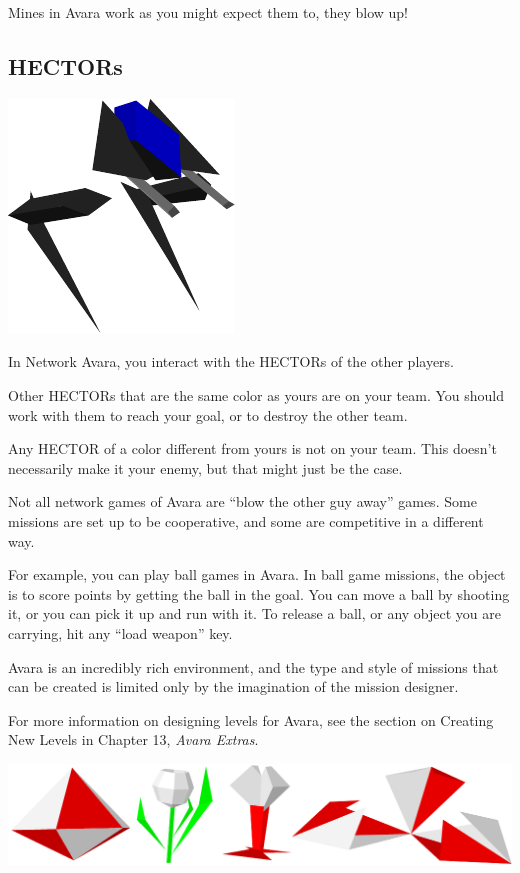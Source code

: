 \documentclass{article}
\begin{document}
Mines in Avara work as you might expect them to, they blow up!

\subsection{HECTORs}
\begin{center}
	\includegraphics{img/10.pdf}
\end{center}

In Network Avara, you interact with the HECTORs of the other players.

Other HECTORs that are the same color as yours are on your team. You should work with them to reach your goal, or to destroy the other team.

Any HECTOR of a color different from yours is not on your team. This doesn't necessarily make it your enemy, but that might just be the case.

Not all network games of Avara are ``blow the other guy away'' games. Some missions are set up to be cooperative, and some are competitive in a different way.

For example, you can play ball games in Avara. In ball game missions, the object is to score points by getting the ball in the goal. You can move a ball by shooting it, or you can pick it up and run with it. To release a ball, or any object you are carrying, hit any ``load weapon'' key.

Avara is an incredibly rich environment, and the type and style of missions that can be created is limited only by the imagination of the mission designer.

For more information on designing levels for Avara, see the section on Creating New Levels in Chapter 13, \textit{Avara Extras}.

\begin{center}
	\includegraphics[width=\textwidth]{img/18.pdf}
\end{center}
\end{document}
